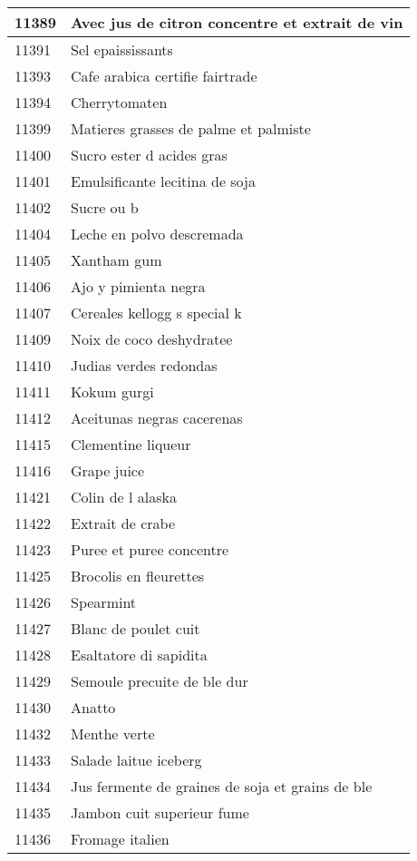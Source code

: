 \begin{longtable}{|l|l|}
11389 & Avec jus de citron concentre et extrait de vin \\ \hline 
11391 & Sel epaississants \\ \hline 
11393 & Cafe arabica certifie fairtrade \\ \hline 
11394 & Cherrytomaten \\ \hline 
11399 & Matieres grasses de palme et palmiste \\ \hline 
11400 & Sucro ester d acides gras \\ \hline 
11401 & Emulsificante lecitina de soja \\ \hline 
11402 & Sucre ou b \\ \hline 
11404 & Leche en polvo descremada \\ \hline 
11405 & Xantham gum \\ \hline 
11406 & Ajo y pimienta negra \\ \hline 
11407 & Cereales kellogg s special k \\ \hline 
11409 & Noix de coco deshydratee \\ \hline 
11410 & Judias verdes redondas \\ \hline 
11411 & Kokum gurgi \\ \hline 
11412 & Aceitunas negras cacerenas \\ \hline 
11415 & Clementine liqueur \\ \hline 
11416 & Grape juice \\ \hline 
11421 & Colin de l alaska \\ \hline 
11422 & Extrait de crabe \\ \hline 
11423 & Puree et puree concentre \\ \hline 
11425 & Brocolis en fleurettes \\ \hline 
11426 & Spearmint \\ \hline 
11427 & Blanc de poulet cuit \\ \hline 
11428 & Esaltatore di sapidita \\ \hline 
11429 & Semoule precuite de ble dur \\ \hline 
11430 & Anatto \\ \hline 
11432 & Menthe verte \\ \hline 
11433 & Salade laitue iceberg \\ \hline 
11434 & Jus fermente de graines de soja et grains de ble \\ \hline 
11435 & Jambon cuit superieur fume \\ \hline 
11436 & Fromage italien \\ \hline 

\end{longtable}
